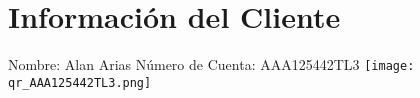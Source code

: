 \documentclass[a4paper]{article}
\begin{document}
\section*{Información del Cliente}
Nombre: Alan Arias
Número de Cuenta: AAA125442TL3
\vspace{1cm}
\texttt{[image: qr\_AAA125442TL3.png]}
\end{document}
